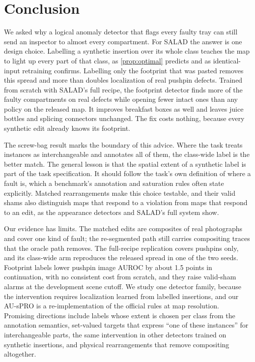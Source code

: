 \section{Conclusion}
\label{sec:conclusion}
We asked why a logical anomaly detector that flags every faulty tray can still send an inspector to almost every compartment. For SALAD the answer is one design choice. Labelling a synthetic insertion over its whole class teaches the map to light up every part of that class, as \cref{prop:optimal} predicts and as identical-input retraining confirms. Labelling only the footprint that was pasted removes this spread and more than doubles localization of real pushpin defects. Trained from scratch with SALAD's full recipe, the footprint detector finds more of the faulty compartments on real defects while opening fewer intact ones than any policy on the released map. It improves breakfast boxes as well and leaves juice bottles and splicing connectors unchanged. The fix costs nothing, because every synthetic edit already knows its footprint.

The screw-bag result marks the boundary of this advice. Where the task treats instances as interchangeable and annotates all of them, the class-wide label is the better match. The general lesson is that the spatial extent of a synthetic label is part of the task specification. It should follow the task's own definition of where a fault is, which a benchmark's annotation and saturation rules often state explicitly. Matched rearrangements make this choice testable, and their valid shams also distinguish maps that respond to a violation from maps that respond to an edit, as the appearance detectors and SALAD's full system show.

Our evidence has limits. The matched edits are composites of real photographs and cover one kind of fault; the re-segmented path still carries compositing traces that the oracle path removes. The full-recipe replication covers pushpins only, and its class-wide arm reproduces the released spread in one of the two seeds. Footprint labels lower pushpin image AUROC by about 1.5 points in continuation, with no consistent cost from scratch, and they raise valid-sham alarms at the development scene cutoff. We study one detector family, because the intervention requires localization learned from labelled insertions, and our AU-sPRO is a re-implementation of the official rules at map resolution. Promising directions include labels whose extent is chosen per class from the annotation semantics, set-valued targets that express ``one of these instances'' for interchangeable parts, the same intervention in other detectors trained on synthetic insertions, and physical rearrangements that remove compositing altogether.
